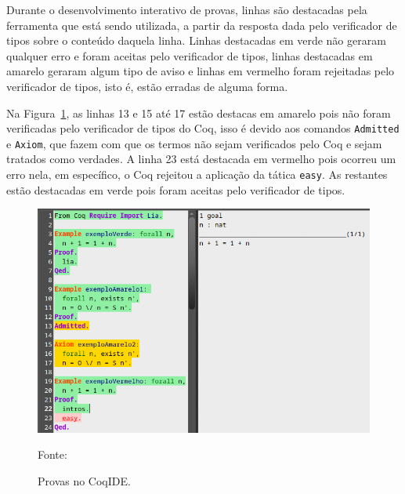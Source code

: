 		Durante o desenvolvimento interativo de provas, linhas são destacadas pela ferramenta que está sendo utilizada, a partir da resposta dada pelo verificador de tipos
		sobre o conteúdo daquela linha. Linhas destacadas em verde não geraram qualquer erro e foram aceitas pelo verificador de tipos, linhas destacadas em amarelo
		geraram algum tipo de aviso e linhas em vermelho foram rejeitadas pelo verificador de tipos, isto é, estão erradas de alguma forma.

		Na Figura~\ref{fig:CoqIDECores}, as linhas 13 e 15 até 17 estão destacas em amarelo pois não foram verificadas pelo verificador de tipos do Coq, isso é devido aos
		comandos \texttt{Admitted} e \texttt{Axiom}, que fazem com que os termos não sejam verificados pelo Coq e sejam tratados como verdades. A linha 23
		está destacada em vermelho pois ocorreu um erro nela, em específico, o Coq rejeitou a aplicação da tática \texttt{easy}. As restantes estão destacadas em verde
		pois foram aceitas pelo verificador de tipos.
		\begin{figure}[htpb!]
			\centering
			\includegraphics[scale=.5]{Figuras/CoqIDECores.png}
			\caption{Provas no CoqIDE.}
			\small{Fonte: \me}
			\label{fig:CoqIDECores}
		\end{figure}

